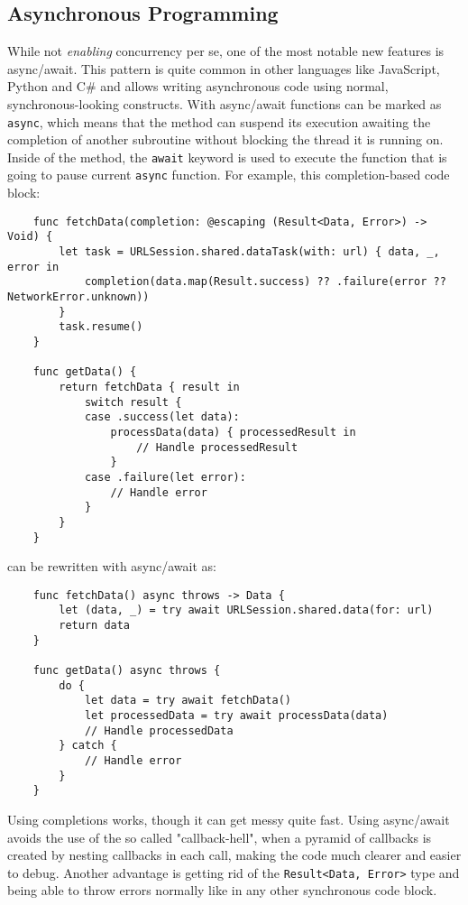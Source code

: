 \subsection{Asynchronous Programming}
\label{sec:async-await}
While not \textit{enabling} concurrency per se, one of the most notable new features is async/await. This pattern is quite common in other languages like JavaScript, Python and C\# and allows writing asynchronous code using normal, synchronous-looking constructs. With async/await functions can be marked as \lstinline{async}, which means that the method can suspend its execution awaiting the completion of another subroutine without blocking the thread it is running on. Inside of the method, the \lstinline{await} keyword is used to execute the function that is going to pause current \lstinline{async} function.
For example, this completion-based code block: 
\begin{verbatim}
    func fetchData(completion: @escaping (Result<Data, Error>) -> Void) {
        let task = URLSession.shared.dataTask(with: url) { data, _, error in
            completion(data.map(Result.success) ?? .failure(error ?? NetworkError.unknown))
        }
        task.resume()
    }

    func getData() {
        return fetchData { result in
            switch result {
            case .success(let data):
                processData(data) { processedResult in
                    // Handle processedResult
                }
            case .failure(let error):
                // Handle error
            }
        }
    }
\end{verbatim}
can be rewritten with async/await as:
\begin{verbatim}
    func fetchData() async throws -> Data {
        let (data, _) = try await URLSession.shared.data(for: url)
        return data
    }
    
    func getData() async throws {
        do {
            let data = try await fetchData()
            let processedData = try await processData(data)
            // Handle processedData
        } catch {
            // Handle error
        }
    }
\end{verbatim}
Using completions works, though it can get messy quite fast.
Using async/await avoids the use of the so called "callback-hell", when a pyramid of callbacks is created by nesting callbacks in each call, making the code much clearer and easier to debug. 
Another advantage is getting rid of the \lstinline{Result<Data, Error>} type and being able to throw errors normally like in any other synchronous code block. \cite{async-await-proposal}

